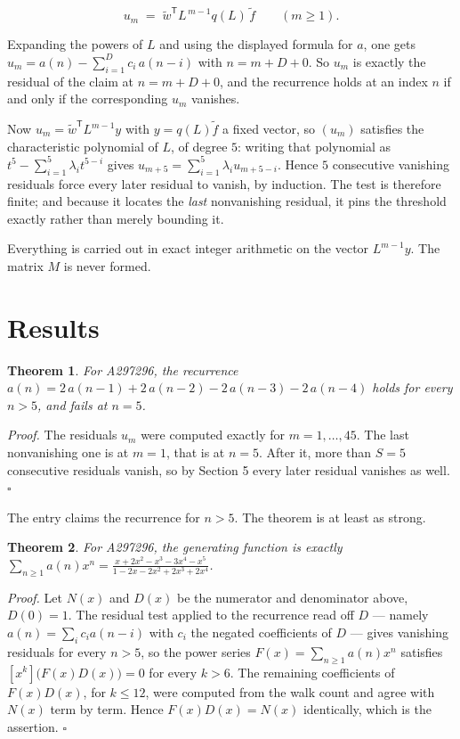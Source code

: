 \documentclass[11pt]{article}
\newtheorem{theorem}{Theorem}
\theoremstyle{definition}
\begin{document}
\[u_m \;=\; \tilde w^{\mathsf T} L^{\,m-1} q(L)\,\tilde f \qquad (m \ge 1).\]

Expanding the powers of $L$ and using the displayed formula for $a$, one gets $u_m = a(n) - \sum_{i=1}^{D} c_i\,a(n-i)$ with $n = m + D + 0$. So $u_m$ is exactly the residual of the claim at $n = m + D + 0$, and the recurrence holds at an index $n$ if and only if the corresponding $u_m$ vanishes.

Now $u_m = \tilde w^{\mathsf T} L^{m-1} y$ with $y = q(L)\tilde f$ a fixed vector, so $(u_m)$ satisfies the characteristic polynomial of $L$, of degree $5$: writing that polynomial as $t^{5} - \sum_{i=1}^{5} \lambda_i t^{5-i}$ gives $u_{m+5} = \sum_{i=1}^{5} \lambda_i u_{m+5-i}$. Hence $5$ consecutive vanishing residuals force every later residual to vanish, by induction. The test is therefore finite; and because it locates the {\itshape last} nonvanishing residual, it pins the threshold exactly rather than merely bounding it.

Everything is carried out in exact integer arithmetic on the vector $L^{m-1}y$. The matrix $M$ is never formed.

\section{Results}

\begin{theorem} For A297296, the recurrence $a(n) = 2\,a(n-1) + 2\,a(n-2) - 2\,a(n-3) - 2\,a(n-4)$ holds for every $n > 5$, and fails at $n = 5$.\end{theorem}

{\itshape Proof.} The residuals $u_m$ were computed exactly for $m = 1,\dots,45$. The last nonvanishing one is at $m = 1$, that is at $n = 5$. After it, more than $S = 5$ consecutive residuals vanish, so by Section 5 every later residual vanishes as well. $\square$

The entry claims the recurrence for $n > 5$. The theorem is at least as strong.

\begin{theorem} For A297296, the generating function is exactly $\sum_{n\ge 1} a(n)x^n = \frac{x + 2x^{2} - x^{3} - 3x^{4} - x^{5}}{1 - 2x - 2x^{2} + 2x^{3} + 2x^{4}}$.\end{theorem}

{\itshape Proof.} Let $N(x)$ and $D(x)$ be the numerator and denominator above, $D(0)=1$. The residual test applied to the recurrence read off $D$ --- namely $a(n) = \sum_i c_i a(n-i)$ with $c_i$ the negated coefficients of $D$ --- gives vanishing residuals for every $n > 5$, so the power series $F(x)=\sum_{n\ge 1}a(n)x^n$ satisfies $[x^k]\bigl(F(x)D(x)\bigr) = 0$ for every $k > 6$. The remaining coefficients of $F(x)D(x)$, for $k \le 12$, were computed from the walk count and agree with $N(x)$ term by term. Hence $F(x)D(x) = N(x)$ identically, which is the assertion. $\square$
\end{document}
